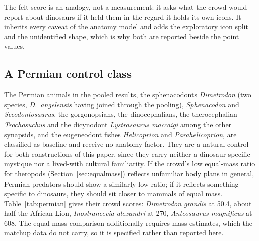 \documentclass[11pt]{article}
\begin{document}
The felt score is an analogy, not a measurement: it asks what the crowd would report about dinosaurs if it held them in the regard it holds its own icons. It inherits every caveat of the anatomy model and adds the exploratory icon split and the unidentified shape, which is why both are reported beside the point values.

\subsection{A Permian control class}
\label{sec:permian}
The Permian animals in the pooled results, the sphenacodonts \textit{Dimetrodon} (two species, \textit{D.~angelensis} having joined through the pooling), \textit{Sphenacodon} and \textit{Secodontosaurus}, the gorgonopsians, the dinocephalians, the therocephalian \textit{Trochosuchus} and the dicynodont \textit{Lystrosaurus maccaigi} among the other synapsids, and the eugeneodont fishes \textit{Helicoprion} and \textit{Parahelicoprion}, are classified as baseline and receive no anatomy factor. They are a natural control for both constructions of this paper, since they carry neither a dinosaur-specific mystique nor a lived-with cultural familiarity. If the crowd's low equal-mass ratio for theropods (Section~\ref{sec:equalmass}) reflects unfamiliar body plans in general, Permian predators should show a similarly low ratio; if it reflects something specific to dinosaurs, they should sit closer to mammals of equal mass. Table~\ref{tab:permian} gives their crowd scores: \textit{Dimetrodon grandis} at 50.4, about half the African Lion, \textit{Inostrancevia alexandri} at 270, \textit{Anteosaurus magnificus} at 608. The equal-mass comparison additionally requires mass estimates, which the matchup data do not carry, so it is specified rather than reported here.
\end{document}
